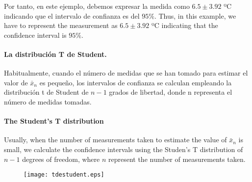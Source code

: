 \begin{paracol}{2}
Por tanto, en este ejemplo, debemos expresar la medida como $6.5 \pm 3.92$ ºC indicando que el intervalo de confianza es del $95\%$.
\switchcolumn
Thus, in this example, we have to represent the measurement as $6.5 \pm 3.92$ ºC indicating that the confidence interval is $95\%$.
\end{paracol}

\begin{paracol}{2}
\paragraph{La distribución T de Student.} Habitualmente, cuando el número de medidas que se han tomado para estimar el valor de $\bar{x}_n$ es pequeño, los intervalos de confianza se calculan empleando la distribución t de Student de $n-1$ grados de libertad, donde  n representa el número de medidas tomadas.

\switchcolumn
\paragraph{The Student's T distribution}

Usually, when the number of measurements taken to estimate the value of $\bar{x}_n$ is small, we calculate the confidence intervals using the Studen's T distribution of $n-1$ degrees of freedom, where $n$ represent the number of measurements taken.  
\end{paracol}

\begin{figure}[h]
\centering
\texttt{[image: tdestudent.eps]}
\label{fig:tdst}
\end{figure}

